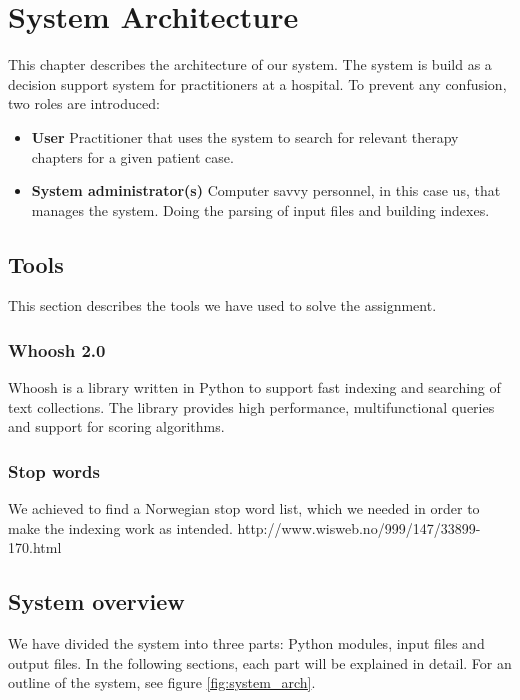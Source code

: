 \chapter{System Architecture}
This chapter describes the architecture of our system. The system is build as a decision support system for practitioners at a hospital. To prevent any confusion, two roles are introduced: 
\begin{itemize}
	\item {\bf User}  Practitioner that uses the system to search for relevant therapy chapters for a given patient case.
	\item {\bf System administrator(s)}  Computer savvy personnel, in this case us, that manages the system. Doing the parsing of input files and building indexes. 
\end{itemize} 

\section{Tools}
This section describes the tools we have used to solve the assignment. 

\subsection{Whoosh 2.0}
Whoosh is a library written in Python to support fast indexing and searching of text collections. The library provides high performance, multifunctional queries and support for scoring algorithms.

\subsection{Stop words}
We achieved to find a Norwegian stop word list, which we needed in order to make the indexing work as intended.
http://www.wisweb.no/999/147/33899-170.html

\section{System overview}
We have divided the system into three parts: Python modules, input files and output files. In the following sections, each part will be explained in detail. For an outline of the system, see figure \ref{fig:system_arch}.

